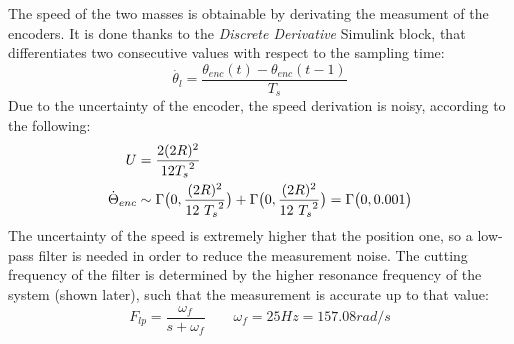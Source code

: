 The speed of the two masses is obtainable by derivating the measument of the encoders. It is done thanks to the \textit{Discrete Derivative} Simulink block, that differentiates two consecutive values with respect to the sampling time:
\[
	\dot{\theta_l} = \frac{ \theta_{enc}(t) - \theta_{enc}(t-1)}{T_s}
\]
Due to the uncertainty of the encoder, the speed derivation is noisy, according to the following:
\begin{align*}
	U &= \frac{2(2R)^2}{12 {T_s}^2 } \\
	\dot{\Theta}_{enc}	&\sim \Gamma \bigl{(} 0,\frac{(2R)^2}{12 \ {T_s}^2} \bigr{)} + \Gamma \bigl{(} 0,\frac{(2R)^2}{12 \ {T_s}^2} \bigr{)} = \Gamma \bigl{(} 0, 0.001 \bigr{)}
\end{align*}
The uncertainty of the speed is extremely higher that the position one, so a low-pass filter is needed in order to reduce the measurement noise. The cutting frequency of the filter is determined by the higher resonance frequency of the system (shown later), such that the measurement is accurate up to that value:
\[
	F_{lp} = \frac{ \omega_f }{ s+\omega_f} \qquad \omega_f=25Hz=157.08 rad/s
\]

